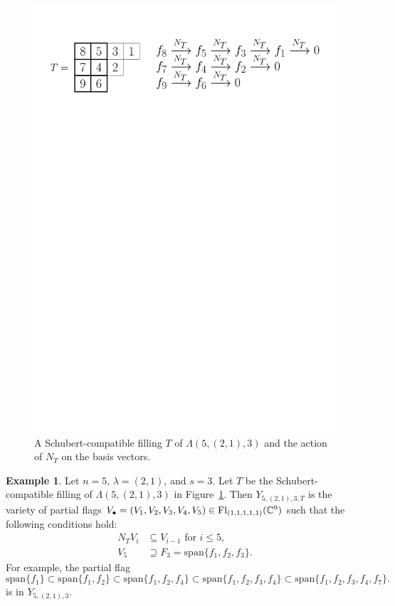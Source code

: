 \documentclass[11pt]{amsart}
\theoremstyle{definition}
\newtheorem{example}[theorem]{Example}
\newcommand{\vspan}{\mathrm{span}}
\newcommand{\Fl}{\mathrm{Fl}}
\begin{document}
\begin{figure}
    \centering
    \includegraphics[scale=0.45]{Figures/SchubertCompatible.pdf}
    \caption{A Schubert-compatible filling $T$ of $\Lambda(5,(2,1),3)$ and the action of $N_T$ on the basis vectors.}
    \label{fig:SchubertCompatible}
\end{figure}

\begin{example}
Let $n=5$, $\lambda = (2,1)$, and $s=3$. Let $T$ be the Schubert-compatible filling of $\Lambda(5,(2,1),3)$ in Figure~\ref{fig:SchubertCompatible}. Then $Y_{5,(2,1),3,T}$ is the variety of partial flags $V_\bullet = (V_1,V_2,V_3,V_4,V_5)\in \Fl_{(1,1,1,1,1)}(\bC^9)$ such that the following conditions hold:
\begin{align}
N_T V_i &\subseteq V_{i-1} \text{ for } i \leq 5, \\
V_5 &\supseteq F_3 = \vspan\{f_1,f_2,f_3\}.
\end{align}
For example, the partial flag 
\begin{equation*}\label{eq:PartialFlag}
\vspan\{ f_1 \} \subset \vspan\{ f_1,f_2 \} \subset 
\vspan\{ f_{1},f_{2},f_{4} \} \subset \vspan\{ f_{1},f_{2},f_{3},f_{4} \} \subset \vspan\{ f_{1},f_{2},f_{3},f_{4},f_{7}\}.
\end{equation*}
is in $Y_{5,(2,1),3}$.
\end{example}
\end{document}
